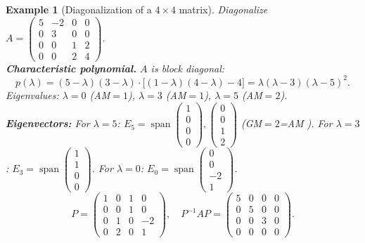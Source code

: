 \documentclass{article}
\newtheorem*{example}{Example}
\newcommand{\Span}{\operatorname{span}}
\begin{document}
\begin{example}[Diagonalization of a $4\times4$ matrix]
    Diagonalize $A=\begin{pmatrix}5&-2&0&0\\0&3&0&0\\0&0&1&2\\0&0&2&4\end{pmatrix}$.\\
    \textbf{Characteristic polynomial.} $A$ is block diagonal:
    \[p(\lambda)=(5-\lambda)(3-\lambda)\cdot\bigl[(1-\lambda)(4-\lambda)-4\bigr] = \lambda(\lambda-3)(\lambda-5)^2.\]
    Eigenvalues: $\lambda=0$ (AM$=1$), $\lambda=3$ (AM$=1$), $\lambda=5$ (AM$=2$).\\
    \textbf{Eigenvectors:} For $\lambda=5$: $E_5 = \Span\!\begin{pmatrix}1\\0\\0\\0\end{pmatrix}\!,\begin{pmatrix}0\\0\\1\\2\end{pmatrix}$ (GM$=2$=AM \checkmark). For $\lambda=3$: $E_3=\Span\begin{pmatrix}1\\1\\0\\0\end{pmatrix}$. For $\lambda=0$: $E_0=\Span\begin{pmatrix}0\\0\\-2\\1\end{pmatrix}$.\\
    \[P=\begin{pmatrix}1&0&1&0\\0&0&1&0\\0&1&0&-2\\0&2&0&1\end{pmatrix},\quad P^{-1}AP=\begin{pmatrix}5&0&0&0\\0&5&0&0\\0&0&3&0\\0&0&0&0\end{pmatrix}.\]
\end{example}
\end{document}
